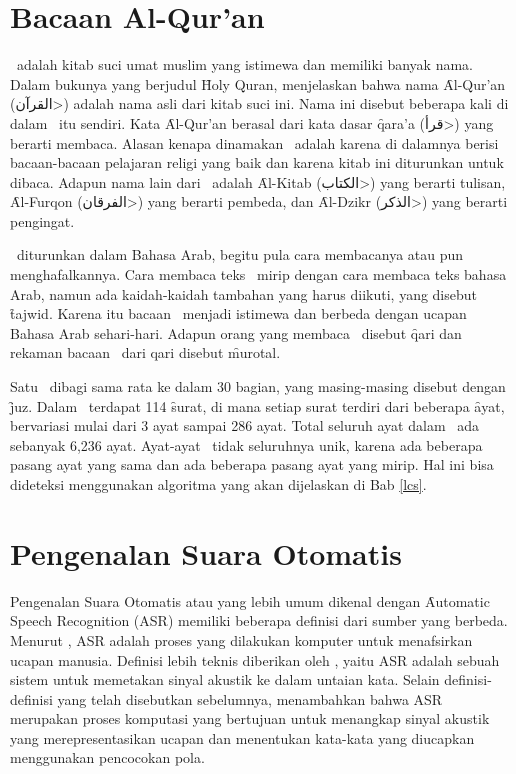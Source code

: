 \section{Bacaan Al-Qur'an} \label{bacaan quran}
\quran~adalah kitab suci umat muslim yang istimewa dan memiliki banyak nama. Dalam bukunya yang berjudul \f{Holy Quran}, \cite{ali2011holy} menjelaskan bahwa nama \f{Al-Qur'an} (\<القرآن>) adalah nama asli dari kitab suci ini. Nama ini disebut beberapa kali di dalam \quran~itu sendiri. Kata \f{Al-Qur'an} berasal dari kata dasar \f{qara'a} (\<قرأ>) yang berarti membaca. Alasan kenapa dinamakan \quran~adalah karena di dalamnya berisi bacaan-bacaan pelajaran religi yang baik dan karena kitab ini diturunkan untuk dibaca. Adapun nama lain dari \quran~adalah \f{Al-Kitab} (\<الكتاب>) yang berarti tulisan, \f{Al-Furqon} (\<الفرقان>) yang berarti pembeda, dan \f{Al-Dzikr} (\<الذكر>) yang berarti pengingat.

\quran~diturunkan dalam Bahasa Arab, begitu pula cara membacanya atau pun menghafalkannya. Cara membaca teks \quran~mirip dengan cara membaca teks bahasa Arab, namun ada kaidah-kaidah tambahan yang harus diikuti, yang disebut \f{tajwid}. Karena itu bacaan \quran~menjadi istimewa dan berbeda dengan ucapan Bahasa Arab sehari-hari. Adapun orang yang membaca \quran~disebut \f{qari} dan rekaman bacaan \quran~dari qari disebut \f{murotal}.

Satu \quran~dibagi sama rata ke dalam 30 bagian, yang masing-masing disebut dengan \f{juz}. Dalam \quran~terdapat 114 \f{surat}, di mana setiap surat terdiri dari beberapa \f{ayat}, bervariasi mulai dari 3 ayat sampai 286 ayat. Total seluruh ayat dalam \quran~ada sebanyak 6,236 ayat. Ayat-ayat \quran~tidak seluruhnya unik, karena ada beberapa pasang ayat yang sama dan ada beberapa pasang ayat yang mirip. Hal ini bisa dideteksi menggunakan algoritma yang akan dijelaskan di Bab \ref{lcs}.

\section{Pengenalan Suara Otomatis}
Pengenalan Suara Otomatis atau yang lebih umum dikenal dengan \f{Automatic Speech Recognition} (ASR) memiliki beberapa definisi dari sumber yang berbeda. Menurut \cite{forsberg2003speech}, ASR adalah proses yang dilakukan komputer untuk menafsirkan ucapan manusia. Definisi lebih teknis diberikan oleh \cite{Jurafsky:2009:SLP:1214993}, yaitu ASR adalah sebuah sistem untuk memetakan sinyal akustik ke dalam untaian kata. Selain definisi-definisi yang telah disebutkan sebelumnya, \cite{chigier1997automatic} menambahkan bahwa ASR merupakan proses komputasi yang bertujuan untuk menangkap sinyal akustik yang merepresentasikan ucapan dan menentukan kata-kata yang diucapkan menggunakan pencocokan pola.

